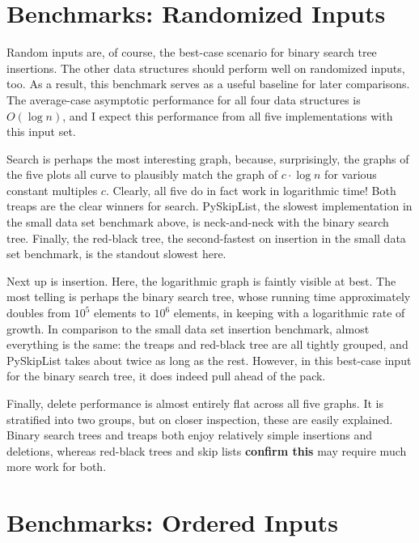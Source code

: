 \documentclass{article}
\newcommand {\todo}[1] {{\textbf{\color{red}#1}}}
\begin{document}
\section{Benchmarks: Randomized Inputs}
Random inputs are, of course, the best-case scenario for binary search tree insertions. The other data structures should perform well on randomized inputs, too. As a result, this benchmark serves as a useful baseline for later comparisons. The average-case asymptotic performance for all four data structures is $O(\log n)$, and I expect this performance from all five implementations with this input set.



Search is perhaps the most interesting graph, because, surprisingly, the graphs of the five plots all curve to plausibly match the graph of $c \cdot \log n$ for various constant multiples $c$. Clearly, all five do in fact work in logarithmic time! Both treaps are the clear winners for search. PySkipList, the slowest implementation in the small data set benchmark above, is neck-and-neck with the binary search tree. Finally, the red-black tree, the second-fastest on insertion in the small data set benchmark, is the standout slowest here.



Next up is insertion. Here, the logarithmic graph is faintly visible at best. The most telling is perhaps the binary search tree, whose running time approximately doubles from $10^5$ elements to $10^6$ elements, in keeping with a logarithmic rate of growth.  In comparison to the small data set insertion benchmark, almost everything is the same: the treaps and red-black tree are all tightly grouped, and PySkipList takes about twice as long as the rest. However, in this best-case input for the binary search tree, it does indeed pull ahead of the pack.



Finally, delete performance is almost entirely flat across all five graphs. It is stratified into two groups, but on closer inspection, these are easily explained. Binary search trees and treaps both enjoy relatively simple insertions and deletions, whereas red-black trees and skip lists \todo{confirm this} may require much more work for both.

\section{Benchmarks: Ordered Inputs}
\end{document}
